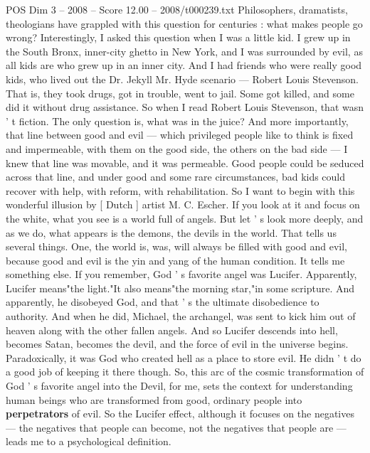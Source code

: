 \begin{textsample}{POS Dim 3 – 2008 – Score 12.00 – 2008/t000239.txt}  \label{ex:f3_pos_062}
Philosophers, dramatists, theologians have grappled with this question for centuries : what makes people go wrong?
Interestingly, I asked this question when I was a little kid.
I grew up in the South Bronx, inner-city ghetto in New York, and I was surrounded by evil, as all kids are who grew up in an inner city.
And I had friends who were really good kids, who lived out the Dr.
Jekyll Mr.
Hyde scenario — Robert Louis Stevenson.
That is, they took drugs, got in trouble, went to jail.
Some got killed, and some did it without drug assistance.
So when I read Robert Louis Stevenson, that wasn ' t fiction.
The only question is, what was in the juice?
And more importantly, that line between good and evil — which privileged people like to think is fixed and impermeable, with them on the good side, the others on the bad side — I knew that line was movable, and it was permeable.
Good people could be seduced across that line, and under good and some rare circumstances, bad kids could recover with help, with reform, with rehabilitation.
So I want to begin with this wonderful illusion by [ Dutch ] artist M.
C.
Escher.
If you look at it and focus on the white, what you see is a world full of angels.
But let ' s look more deeply, and as we do, what appears is the demons, the devils in the world.
That tells us several things.
One, the world is, was, will always be filled with good and evil, because good and evil is the yin and yang of the human condition.
It tells me something else.
If you remember, God ' s favorite angel was Lucifer.
Apparently, Lucifer means"the light."It also means"the morning star,"in some scripture.
And apparently, he disobeyed God, and that ' s the ultimate disobedience to authority.
And when he did, Michael, the archangel, was sent to kick him out of heaven along with the other fallen angels.
And so Lucifer descends into hell, becomes Satan, becomes the devil, and the force of evil in the universe begins.
Paradoxically, it was God who created hell as a place to store evil.
He didn ' t do a good job of keeping it there though.
So, this arc of the cosmic transformation of God ' s favorite angel into the Devil, for me, sets the context for understanding human beings who are transformed from good, ordinary people into \textbf{perpetrators} of evil.
So the Lucifer effect, although it focuses on the negatives — the negatives that people can become, not the negatives that people are — leads me to a psychological definition.

\end{textsample}
